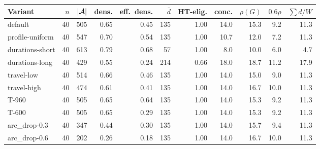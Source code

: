 \begin{tabular}{lrrrrrrrrrr}
\toprule
Variant & $n$ & $|\mathcal{A}|$ & dens. & eff.\ dens. & $\bar d$ & HT-elig. & conc. & $\rho(G)$ & $0.6\rho$ & $\sum d/W$ \\
\midrule
default & 40 & 505 & 0.65 & 0.45 & 135 & 1.00 & 14.0 & 15.3 & 9.2 & 11.3 \\
profile-uniform & 40 & 547 & 0.70 & 0.54 & 135 & 1.00 & 10.7 & 12.0 & 7.2 & 11.3 \\
durations-short & 40 & 613 & 0.79 & 0.68 & 57 & 1.00 & 8.0 & 10.0 & 6.0 & 4.7 \\
durations-long & 40 & 429 & 0.55 & 0.24 & 214 & 0.66 & 18.0 & 18.7 & 11.2 & 17.9 \\
travel-low & 40 & 514 & 0.66 & 0.46 & 135 & 1.00 & 14.0 & 15.0 & 9.0 & 11.3 \\
travel-high & 40 & 474 & 0.61 & 0.41 & 135 & 1.00 & 14.0 & 16.7 & 10.0 & 11.3 \\
T-960 & 40 & 505 & 0.65 & 0.64 & 135 & 1.00 & 14.0 & 15.3 & 9.2 & 11.3 \\
T-600 & 40 & 505 & 0.65 & 0.29 & 135 & 1.00 & 14.0 & 15.3 & 9.2 & 11.3 \\
arc\_drop-0.3 & 40 & 347 & 0.44 & 0.30 & 135 & 1.00 & 14.0 & 15.7 & 9.4 & 11.3 \\
arc\_drop-0.6 & 40 & 202 & 0.26 & 0.18 & 135 & 1.00 & 14.0 & 16.7 & 10.0 & 11.3 \\
\bottomrule
\end{tabular}
